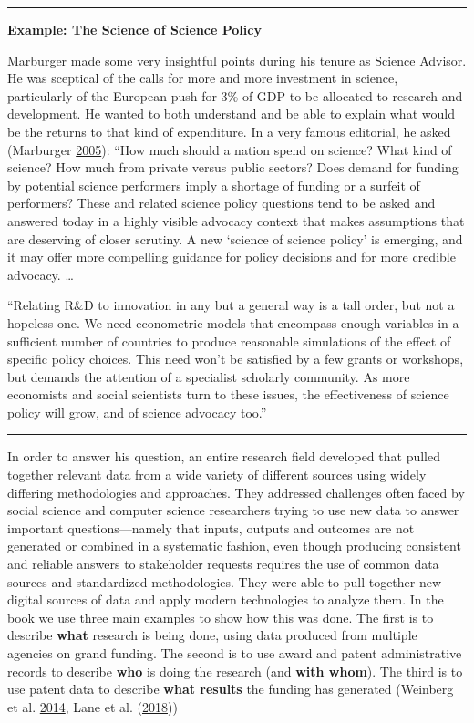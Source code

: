 \documentclass[]{krantz}
\begin{document}
\begin{center}\rule{0.5\linewidth}{\linethickness}\end{center}

\textbf{Example: The Science of Science Policy}

Marburger made some very insightful points during his tenure as Science
Advisor. He was sceptical of the calls for more and more investment in
science, particularly of the European push for 3\% of GDP to be
allocated to research and development. He wanted to both understand and
be able to explain what would be the returns to that kind of
expenditure. In a very famous editorial, he asked (Marburger
\protect\hyperlink{ref-marburger2005wanted}{2005}): ``How much should a
nation spend on science? What kind of science? How much from private
versus public sectors? Does demand for funding by potential science
performers imply a shortage of funding or a surfeit of performers? These
and related science policy questions tend to be asked and answered today
in a highly visible advocacy context that makes assumptions that are
deserving of closer scrutiny. A new `science of science policy' is
emerging, and it may offer more compelling guidance for policy decisions
and for more credible advocacy. \ldots{}

``Relating R\&D to innovation in any but a general way is a tall order,
but not a hopeless one. We need econometric models that encompass enough
variables in a sufficient number of countries to produce reasonable
simulations of the effect of specific policy choices. This need won't be
satisfied by a few grants or workshops, but demands the attention of a
specialist scholarly community. As more economists and social scientists
turn to these issues, the effectiveness of science policy will grow, and
of science advocacy too.''

\begin{center}\rule{0.5\linewidth}{\linethickness}\end{center}

In order to answer his question, an entire research field developed that
pulled together relevant data from a wide variety of different sources
using widely differing methodologies and approaches. They addressed
challenges often faced by social science and computer science
researchers trying to use new data to answer important
questions---namely that inputs, outputs and outcomes are not generated
or combined in a systematic fashion, even though producing consistent
and reliable answers to stakeholder requests requires the use of common
data sources and standardized methodologies. They were able to pull
together new digital sources of data and apply modern technologies to
analyze them. In the book we use three main examples to show how this
was done. The first is to describe \textbf{what} research is being done,
using data produced from multiple agencies on grand funding. The second
is to use award and patent administrative records to describe
\textbf{who} is doing the research (and \textbf{with whom}). The third
is to use patent data to describe \textbf{what results} the funding has
generated (Weinberg et al.
\protect\hyperlink{ref-weinberg2014science}{2014}, Lane et al.
(\protect\hyperlink{ref-Lane2018}{2018}))
\end{document}
